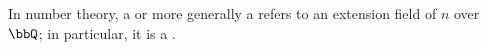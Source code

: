 \begin{definition} \label{definition:quadratic_cubic_quartic_quintic_sextic_field}
    In number theory, a  or more generally a  refers to an extension field of  $n$ over $\bbQ$; in particular, it is a . 
\end{definition}